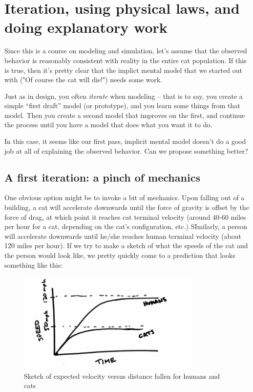 \section{Iteration, using physical laws, and doing explanatory work}

Since this is a course on modeling and simulation, let's assume that the observed behavior is reasonably consistent with reality in the entire cat population.
If this is true, then it's pretty clear that the implict mental model that we started out with ("Of course the cat will die!") needs some work.

Just as in design, you often {\it iterate} when modeling -- that is to say, you create a simple ``first draft'' model (or prototype), and you learn some things from that model.  Then you create a second model that improves on the first, and continue the process until you have a model that does what you want it to do.

In this case, it seems like our first pass, implicit mental model doesn't do a good job at all of explaining the observed behavior.  Can we propose something better?

\subsection{A first iteration: a pinch of mechanics}

One obvious option might be to invoke a bit of mechanics.  Upon falling out of a building, a cat will accelerate downwards until the force of gravity is offset by the force of drag, at which point it reaches cat terminal velocity (around 40-60 miles per hour for a cat, depending on the cat's configuration, etc.)  SImilarly, a person will accelerate downwards until he/she reaches human terminal velocity (about 120 miles per hour).  If we try to make a sketch of what the speeds of the cat and the person would look like, we pretty quickly come to a prediction that looks something like this:

\begin{figure}
\centerline{\includegraphics[height=5cm]{figs/TerminalVelocitySketch}}
\caption{Sketch of expected velocity versus distance fallen for humans and cats}
\end{figure}

